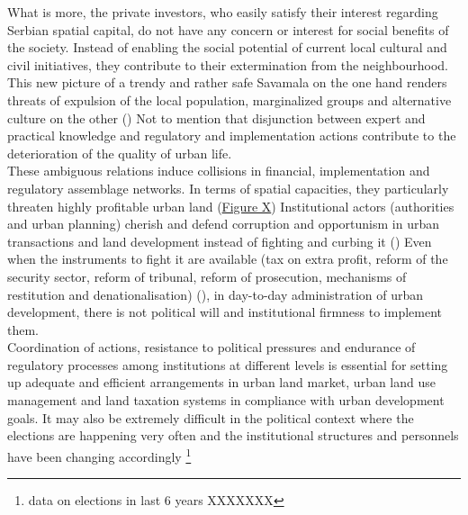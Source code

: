 \documentclass[11pt]{report}
\begin{document}
What is more, the private investors, who easily satisfy their interest regarding Serbian spatial capital, do not have any concern or interest for social benefits of the society. Instead of enabling the social potential of current local cultural and civil initiatives, they contribute to their extermination from the neighbourhood.
This new picture of a trendy and rather safe Savamala on the one hand renders threats of expulsion of the local population, marginalized groups and alternative culture on the other
(\href{Krusche}{\cite{KruscheAndKlaus2015}})
Not to mention that disjunction between expert and practical knowledge and regulatory and implementation actions contribute to the deterioration of the quality of urban life.
\\

These ambiguous relations induce collisions in financial, implementation and regulatory assemblage networks. In terms of spatial capacities, they particularly threaten highly profitable urban land (\href{FigureX}{Figure X})
Institutional actors (authorities and urban planning) cherish and defend corruption and opportunism in urban transactions and land development instead of fighting and curbing it (\href{NedovicBudic}{\cite{NedovicBudicEtAl.2011}})
Even when the instruments to fight it are available (tax on extra profit, reform of the security sector, reform of tribunal, reform of prosecution, mechanisms of restitution and denationalisation) (\href{Vujoseivc}{\cite{(VujosevicEtAl.2010}}),
in day-to-day administration of urban
development, there is not political will and institutional firmness to implement them.
\\

Coordination of actions, resistance to political pressures and endurance of regulatory processes among institutions at different levels is essential for setting up adequate and efficient arrangements in urban land market, urban land use management and land taxation systems in compliance with urban development goals.
It may also be extremely difficult in the political context where the elections are happening very often and the institutional structures and personnels have been changing accordingly
\footnote{data on elections in last 6 years XXXXXXX}
\\
\end{document}
